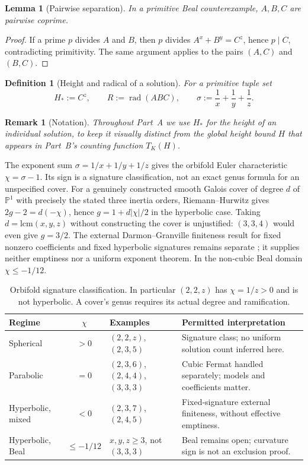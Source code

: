 \documentclass[11pt,a4paper]{article}
\DeclareMathOperator{\rad}{rad}
\newtheorem{lemma}[theorem]{Lemma}
\newtheorem{definition}[theorem]{Definition}
\newtheorem{remark}[theorem]{Remark}
\begin{document}
\begin{lemma}[Pairwise separation]
\label{lem:pairwise}
In a primitive Beal counterexample, $A,B,C$ are pairwise coprime.
\end{lemma}

\begin{proof}
If a prime $p$ divides $A$ and $B$, then $p$ divides $A^x+B^y=C^z$,
hence $p \mid C$, contradicting primitivity. The same argument applies
to the pairs $(A,C)$ and $(B,C)$.
\end{proof}

\begin{definition}[Height and radical of a solution]
For a primitive tuple set
\[
  H_* := C^z, \qquad R := \rad(ABC), \qquad
  \sigma := \frac1x+\frac1y+\frac1z.
\]
\end{definition}

\begin{remark}[Notation]
Throughout Part~A we use $H_*$ for the height of an individual
solution, to keep it visually distinct from the global height bound
$H$ that appears in Part~B's counting function $T_K(H)$.
\end{remark}

The exponent sum $\sigma=1/x+1/y+1/z$ gives the orbifold
Euler characteristic $\chi=\sigma-1$. Its sign is a signature
classification, not an exact genus formula for an unspecified cover.
For a genuinely constructed smooth Galois cover of degree $d$ of
$\mathbb P^1$ with precisely the stated three inertia orders,
Riemann--Hurwitz gives $2g-2=d(-\chi)$, hence
$g=1+d|\chi|/2$ in the hyperbolic case. Taking
$d=\mathrm{lcm}(x,y,z)$ without constructing the cover is unjustified:
$(3,3,4)$ would even give $g=3/2$.
The external Darmon--Granville finiteness result for fixed nonzero
coefficients and fixed hyperbolic signatures remains separate
\cite{DarmonGranville1995}; it supplies neither emptiness nor a uniform
exponent theorem. In the non-cubic Beal domain $\chi\le-1/12$.
\begin{table}[!htbp]
\centering\small
\begin{tabularx}{\textwidth}{@{}l c >{\raggedright\arraybackslash}p{3.1cm} >{\raggedright\arraybackslash}X@{}}
\toprule
Regime & $\chi$ & Examples & Permitted interpretation\\
\midrule
Spherical & $>0$ & $(2,2,z)$, $(2,3,5)$ & Signature class; no uniform solution count inferred here.\\
\addlinespace
Parabolic & $=0$ & $(2,3,6)$, $(2,4,4)$, $(3,3,3)$ & Cubic Fermat handled separately; models and coefficients matter.\\
\addlinespace
Hyperbolic, mixed & $<0$ & $(2,3,7)$, $(2,4,5)$ & Fixed-signature external finiteness, without effective emptiness.\\
\addlinespace
Hyperbolic, Beal & $\le-1/12$ & $x,y,z\ge3$, not $(3,3,3)$ & Beal remains open; curvature sign is not an exclusion proof.\\
\bottomrule
\end{tabularx}
\caption{Orbifold signature classification. In particular $(2,2,z)$ has $\chi=1/z>0$ and is not hyperbolic. A cover's genus requires its actual degree and ramification.}
\label{tab:regime_matrix}
\end{table}
\end{document}
